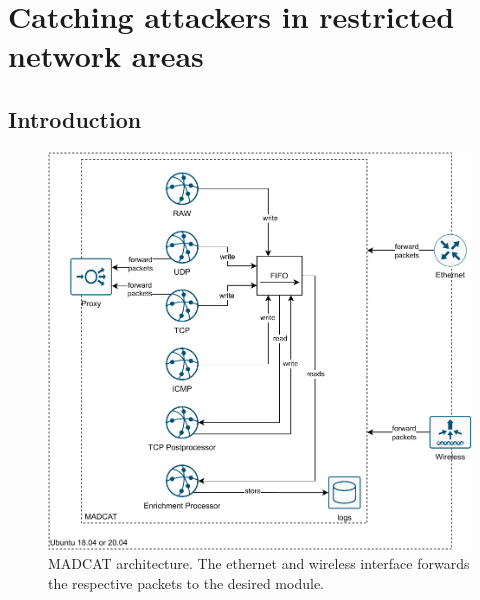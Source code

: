 \chapter{Catching attackers in restricted network areas}
\label{chap:concept}


\section{Introduction}

\begin{figure}[ht]
    \centering
    \includegraphics[width=\textwidth]{figures/heicat-architecture.pdf}
    \caption[MADCAT architecture.]{MADCAT architecture. The ethernet and wireless interface forwards the respective packets to the desired module.}
    \label{fig:heicat-architecture}
\end{figure}

